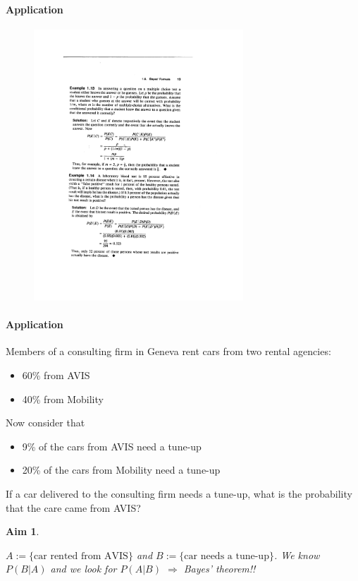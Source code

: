 \documentclass[notes=show, handout]{beamer}\usepackage[]{graphicx}\usepackage[]{color}
\newtheorem{aim}{Aim}[section]
\begin{document}
\begin{frame}{\secname}
\framesubtitle{Application}
  \begin{example}
  \begin{figure}[h!]
  \centering
  \includegraphics[width=0.7\textwidth,height=0.65\textheight]{img/Ross_Ex.pdf}
  \end{figure}
  \end{example}
\end{frame}

\begin{frame}{\secname}
\framesubtitle{Application}
  \begin{example}
  \begin{footnotesize}
  Members of a consulting firm in Geneva rent cars from two rental agencies:
  \begin{itemize}
  \item 60\% from AVIS
  \item 40\% from Mobility
  \end{itemize}
  Now consider that
  \begin{itemize}
  \item 9\% of the cars from AVIS need a tune-up
  \item 20\% of the cars from Mobility need a tune-up
  \end{itemize}
  If a car delivered to the consulting firm needs a tune-up, what is the probability that the care came
  from AVIS?
  \end{footnotesize}
  \end{example}
  \begin{aim}
  \begin{footnotesize}
  $A:=\{\text{car rented from AVIS}\}$ and $B:=\{\text{car needs a tune-up}\}$. We know $P(B\vert A)$ and we look for $P(A\vert B)$ $\Rightarrow$ Bayes' theorem!!
  \end{footnotesize}
  \end{aim}
\end{frame}
\end{document}
